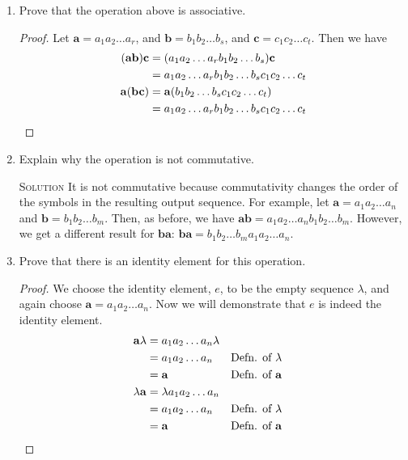 \documentclass[twoside]{amsart}
\newcommand{\Solution}{\textsc{Solution}\xspace}
\begin{document}
\begin{enumerate}
   \item Prove that the operation above is associative.
   
   \begin{proof}
      Let $\mathbf{a} = a_1 a_2 \ldots a_r$, and $\mathbf{b} = b_1 b_2
      \ldots b_s$, and $\mathbf{c} = c_1 c_2 \ldots c_t$. Then we have
      \begin{align*}
        (\mathbf{ab})\mathbf{c} 
	               & = (a_1 a_2 \ldots a_r b_1 b_2 \ldots b_s)\mathbf{c}\\
	               & = a_1 a_2 \ldots a_r b_1 b_2 \ldots b_s c_1 c_2 
		           \ldots c_t \\
        \mathbf{a}(\mathbf{bc})
	               & = \mathbf{a}(b_1 b_2 \ldots b_s c_1 c_2 \ldots c_t)\\
	               & = a_1 a_2 \ldots a_r b_1 b_2 \ldots b_s c_1 c_2 
		           \ldots c_t \qedhere
      \end{align*}
   \end{proof}

   \item Explain why the operation is not commutative. 
   
   \noindent \Solution It is not commutative
   because commutativity changes the order of the symbols in the resulting
   output sequence. For example, let $\mathbf{a} = a_1 a_2 \ldots a_n$ and 
   $\mathbf{b} = b_1 b_2 \ldots b_m$. Then, as before, we have 
   $\mathbf{ab} = a_1 a_2 \ldots a_n b_1 b_2 \ldots b_m$. However, we
   get a different result for $\mathbf{ba}$: $\mathbf{ba} = b_1 b_2 \ldots
   b_m a_1 a_2 \ldots a_n$.

   \item Prove that there is an identity element for this operation.

   \begin{proof}
      We choose the identity element, $e$, to be the empty sequence $\lambda$,
      and again choose $\mathbf{a} = a_1 a_2 \ldots a_n$.
      Now we will demonstrate that $e$ is indeed the identity element.
      \begin{align*}
         \mathbf{a}\lambda & = a_1 a_2 \ldots a_n \lambda \\
	                   & = a_1 a_2 \ldots a_n 
			            && \text{Defn. of $\lambda$} \\
			   & = \mathbf{a} && \text{Defn. of $\mathbf{a}$} \\
	 \lambda\mathbf{a} & = \lambda a_1 a_2 \ldots a_n \\
	                   & = a_1 a_2 \ldots a_n 
			            && \text{Defn. of $\lambda$} \\
			   & = \mathbf{a} && \text{Defn. of
                             $\mathbf{a}$} \qedhere
      \end{align*} 
   \end{proof}

\end{enumerate}
\end{document}
